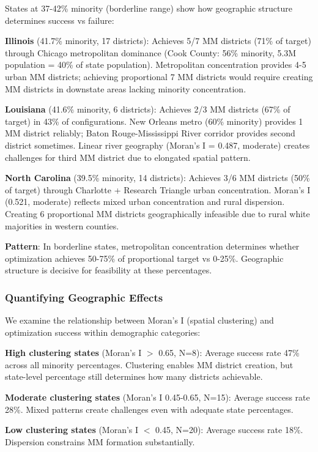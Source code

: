 States at 37-42\% minority (borderline range) show how geographic structure determines success vs failure:

\textbf{Illinois} (41.7\% minority, 17 districts): Achieves 5/7 MM districts (71\% of target) through Chicago metropolitan dominance (Cook County: 56\% minority, 5.3M population = 40\% of state population). Metropolitan concentration provides 4-5 urban MM districts; achieving proportional 7 MM districts would require creating MM districts in downstate areas lacking minority concentration.

\textbf{Louisiana} (41.6\% minority, 6 districts): Achieves 2/3 MM districts (67\% of target) in 43\% of configurations. New Orleans metro (60\% minority) provides 1 MM district reliably; Baton Rouge-Mississippi River corridor provides second district sometimes. Linear river geography (Moran's I = 0.487, moderate) creates challenges for third MM district due to elongated spatial pattern.

\textbf{North Carolina} (39.5\% minority, 14 districts): Achieves 3/6 MM districts (50\% of target) through Charlotte + Research Triangle urban concentration. Moran's I (0.521, moderate) reflects mixed urban concentration and rural dispersion. Creating 6 proportional MM districts geographically infeasible due to rural white majorities in western counties.

\textbf{Pattern}: In borderline states, metropolitan concentration determines whether optimization achieves 50-75\% of proportional target vs 0-25\%. Geographic structure is decisive for feasibility at these percentages.

\subsubsection{Quantifying Geographic Effects}

We examine the relationship between Moran's I (spatial clustering) and optimization success within demographic categories:

\textbf{High clustering states} (Moran's I $>$ 0.65, N=8): Average success rate 47\% across all minority percentages. Clustering enables MM district creation, but state-level percentage still determines how many districts achievable.

\textbf{Moderate clustering states} (Moran's I 0.45-0.65, N=15): Average success rate 28\%. Mixed patterns create challenges even with adequate state percentages.

\textbf{Low clustering states} (Moran's I $<$ 0.45, N=20): Average success rate 18\%. Dispersion constrains MM formation substantially.

